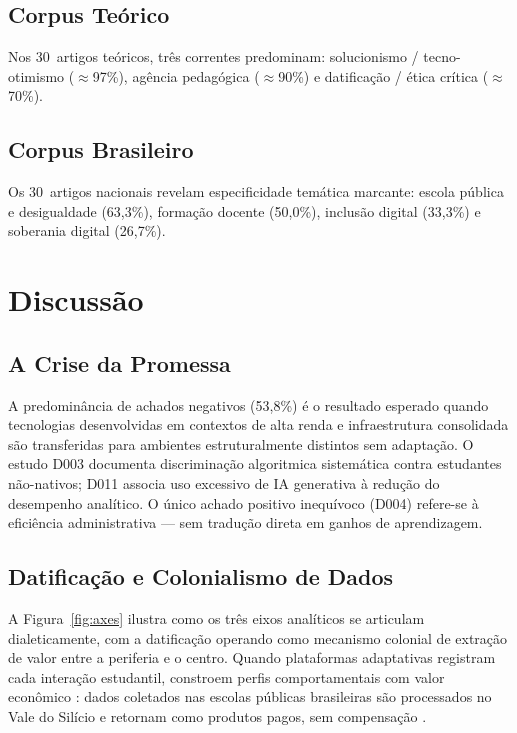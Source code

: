 \documentclass[preprint,12pt,authoryear]{elsarticle}
\begin{document}
\subsection{Corpus Teórico}

Nos 30~artigos teóricos, três correntes predominam: solucionismo /
tecno-otimismo ($\approx$97\%), agência pedagógica ($\approx$90\%)
e datificação / ética crítica ($\approx$70\%).

\subsection{Corpus Brasileiro}

Os 30~artigos nacionais revelam especificidade temática marcante:
escola pública e desigualdade (63,3\%), formação docente (50,0\%),
inclusão digital (33,3\%) e soberania digital (26,7\%).

\section{Discussão}

\subsection{A Crise da Promessa}

A predominância de achados negativos (53,8\%) é o resultado esperado
quando tecnologias desenvolvidas em contextos de alta renda e
infraestrutura consolidada são transferidas para ambientes
estruturalmente distintos sem adaptação.
O estudo D003 documenta discriminação algoritmica sistemática contra
estudantes não-nativos; D011 associa uso excessivo de IA generativa
à redução do desempenho analítico.
O único achado positivo inequívoco (D004) refere-se à eficiência
administrativa --- sem tradução direta em ganhos de aprendizagem.

\subsection{Datificação e Colonialismo de Dados}

A Figura~\ref{fig:axes} ilustra como os três eixos analíticos se
articulam dialeticamente, com a datificação operando como mecanismo
colonial de extração de valor entre a periferia e o centro.
Quando plataformas adaptativas registram cada interação estudantil,
constroem perfis comportamentais com valor econômico
\citep{Zuboff2019}: dados coletados nas escolas públicas brasileiras
são processados no Vale do Silício e retornam como produtos pagos,
sem compensação \citep{Noble2018,Williamson2017}.
\end{document}
